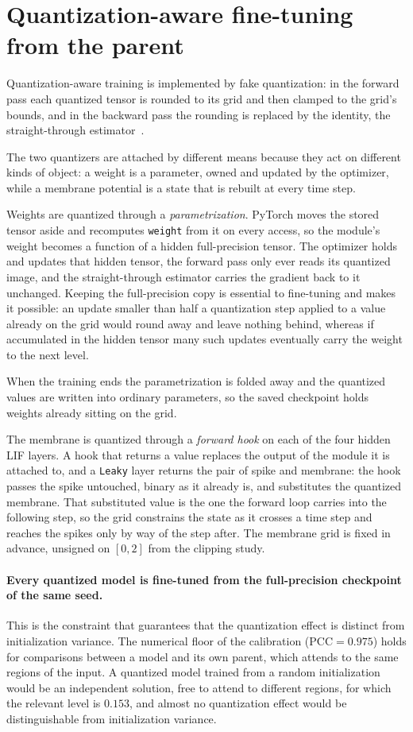 \section{Quantization-aware fine-tuning from the parent}
\label{sec:qat}

Quantization-aware training is implemented by fake quantization: in the forward
pass each quantized tensor is rounded to its grid and then clamped to the grid's
bounds, and in the backward pass the rounding is replaced by the identity, the
straight-through estimator~\cite{bengio2013ste}.

The two quantizers are attached by
different means because they act on different
kinds of object: a weight is a parameter, owned and updated by the optimizer, while
a membrane potential is a state that is rebuilt at every time step.

Weights are quantized through a \emph{parametrization}. PyTorch moves the
stored tensor aside and recomputes \texttt{weight} from it on every access, so
the module's weight becomes a function of a hidden full-precision tensor.
The optimizer holds and updates that
hidden tensor, the forward pass only ever reads its quantized image, and the
straight-through estimator carries the gradient back to it unchanged. Keeping
the full-precision copy is essential to fine-tuning and makes it possible: an update
smaller than half a quantization step applied to a value already on the grid
would round away and leave nothing behind, whereas if accumulated in the hidden
tensor many such updates eventually carry the weight to the next level.

When the
training ends the parametrization is folded away and the quantized values are
written into ordinary parameters, so the saved checkpoint holds weights
already sitting on the grid.

The membrane is quantized through a \emph{forward hook} on each of the four
hidden LIF layers. A hook that returns a value replaces the output of the
module it is attached to, and a \texttt{Leaky} layer returns the pair of spike
and membrane: the hook passes the spike untouched, binary as it
already is, and substitutes the quantized membrane. That substituted value is
the one the forward loop carries into the following step, so the grid
constrains the state as it crosses a time step and reaches the spikes only by
way of the step after. The membrane grid is fixed in advance, unsigned on $[0, 2]$ from
the clipping study.

\paragraph{Every quantized model is fine-tuned from the full-precision
checkpoint of the same seed.} This is the constraint that guarantees
that the quantization effect is distinct from initialization variance.
The numerical floor of the calibration ($\mathrm{PCC} = 0.975$) holds
for comparisons between a model and its own parent, which attends to the same
regions of the input. A quantized model trained from a random initialization
would be an independent solution, free to attend to different regions, for which
the relevant level is $0.153$, and almost no quantization effect would be
distinguishable from initialization variance.

